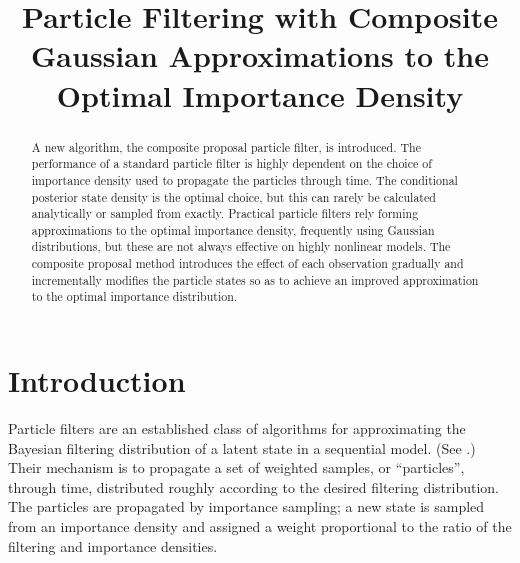 \documentclass[conference]{IEEEtran}
\begin{document}
\title{Particle Filtering with Composite Gaussian Approximations to the Optimal Importance Density}
\author{
\and
{}
}

\maketitle

\begin{abstract}
A new algorithm, the composite proposal particle filter, is introduced. The performance of a standard particle filter is highly dependent on the choice of importance density used to propagate the particles through time. The conditional posterior state density is the optimal choice, but this can rarely be calculated analytically or sampled from exactly. Practical particle filters rely forming approximations to the optimal importance density, frequently using Gaussian distributions, but these are not always effective on highly nonlinear models. The composite proposal method introduces the effect of each observation gradually and incrementally modifies the particle states so as to achieve an improved approximation to the optimal importance distribution.
\end{abstract}


\IEEEpeerreviewmaketitle



\section{Introduction}

Particle filters are an established class of algorithms for approximating the Bayesian filtering distribution of a latent state in a sequential model. (See \cite{Cappe2007,Doucet2009}.) Their mechanism is to propagate a set of weighted samples, or ``particles'', through time, distributed roughly according to the desired filtering distribution. The particles are propagated by importance sampling; a new state is sampled from an importance density and assigned a weight proportional to the ratio of the filtering and importance densities.
\end{document}
